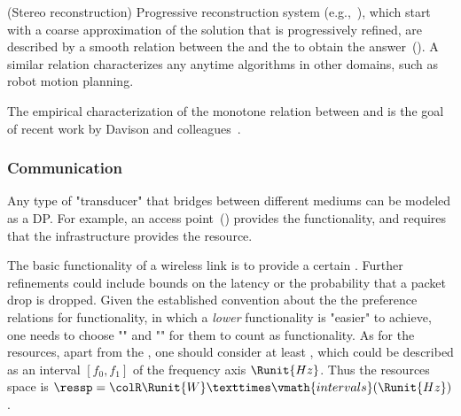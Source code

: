 \begin{example}
(Stereo reconstruction) Progressive reconstruction system (e.g.,~\cite{locher16progressive}),
which start with a coarse approximation of the solution that is progressively
refined, are described by a smooth relation between the 
and the  to obtain the answer~().
A similar relation characterizes any anytime algorithms in other domains,
such as robot motion planning.
\end{example}


\begin{figure}[h]
    \centering
\caption{\label{fig:progressive} }
\end{figure}


\begin{example}
The empirical characterization of the monotone relation between  and 
is the goal of recent work by Davison and colleagues~\cite{nardi15introducing,zia16comparative}.
\end{example}



\subsubsection{Communication}

\begin{example}[Transducers]
Any type of "transducer" that bridges between different
mediums can be modeled as a DP. For example, an access point~()
provides the  functionality, and requires
that the infrastructure provides the  resource.
\end{example}


\begin{figure}[h] 
    \centering
    \caption{\label{fig:accesspoint}}
\end{figure}

\begin{example}
The basic functionality of a wireless link is to provide
a certain . Further refinements could include bounds
on the latency or the probability that a packet drop is dropped. Given
the established convention about the the preference relations for
functionality, in which a \emph{lower} functionality is "easier"
to achieve, one needs to choose ""
and "" for them
to count as functionality. As for the resources, apart from the , one should consider at least ,
which could be described as an interval $[f_0,f_1]$ of the frequency
axis $\Runit{Hz}$. Thus the resources space is $\ressp=\colR\Runit{W}×\vmath{intervals}(\Runit{Hz})$.
\end{example}

